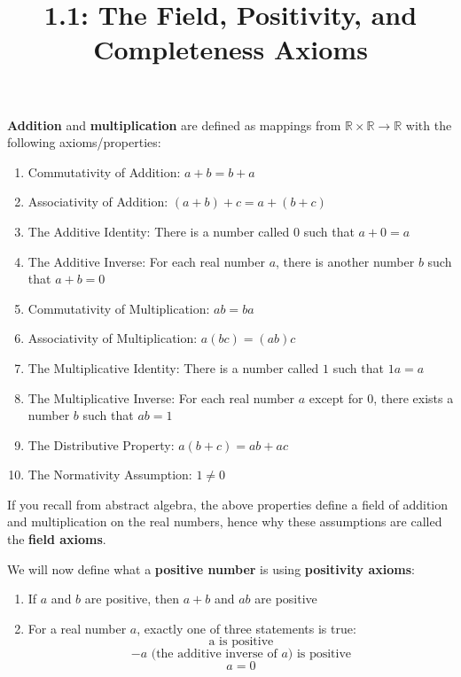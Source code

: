\documentclass{article}
\title{1.1: The Field, Positivity, and Completeness Axioms}
\begin{document}
\maketitle
\begin{definition}

\textbf{Addition} and \textbf{multiplication} are defined as mappings from $\mathbb{R} \times \mathbb{R} \to \mathbb{R}$ with the following axioms/properties:  

\begin{enumerate}
    \item Commutativity of Addition: $a+b = b+a$
    \item Associativity of Addition: $(a+b) + c = a + (b+c)$
    \item The Additive Identity: There is a number called $0$ such that $a + 0 = a$
    \item The Additive Inverse: For each real number $a$, there is another number $b$ such that $a + b = 0$
    \item Commutativity of Multiplication: $ab = ba$
    \item Associativity of Multiplication: $a(bc) = (ab)c$
    \item The Multiplicative Identity: There is a number called $1$ such that $1a = a$
    \item The Multiplicative Inverse: For each real number $a$ except for $0$, there exists a number $b$ such that $ab = 1$
    \item The Distributive Property: $a(b+c) = ab + ac$
    \item The Normativity Assumption: $1\neq 0$
\end{enumerate}

If you recall from abstract algebra, the above properties define a field of addition and multiplication on the real numbers, hence why these assumptions are called the \textbf{field axioms}.

\end{definition}


\begin{definition}
We will now define what a \textbf{positive number} is using \textbf{positivity axioms}:

\begin{enumerate}
    \item If $a$ and $b$ are positive, then $a+b$ and $ab$ are positive
    \item For a real number $a$, exactly one of three statements is true: $$\text{a is positive}$$ $$-a \text{ (the additive inverse of $a$) is positive}$$ $$a = 0$$
\end{enumerate}
\end{definition}
\end{document}
